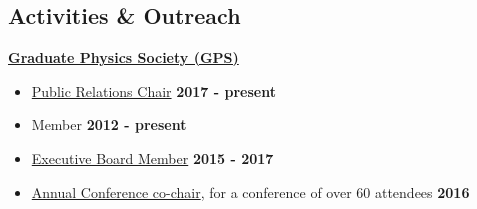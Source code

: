 \documentclass[margin]{res}
\begin{document}
\begin{resume}
\section{Activities \& Outreach} %

\textbf{\href{gradphysics.nd.edu}{Graduate Physics Society (GPS)}}%
\begin{itemize}\itemsep -2pt
    \item[] \href{http://gradphysics.nd.edu/about-us/committee-chairs/}{Public Relations Chair} \hfill {\bf 2017 - present}
    \item[] Member \hfill {\bf 2012 - present}
    \item[] \href{http://gradphysics.nd.edu/about-us/executive-board/}{Executive Board Member} \hfill {\bf 2015 - 2017}
    \item[] \href{http://gradphysics.nd.edu/conference/gpsac-2016/}{Annual Conference co-chair}, for a conference of over 60 attendees \hfill {\bf 2016}
\end{itemize} \vspace{-12pt}

\end{resume}
\end{document}
